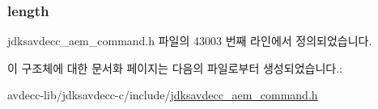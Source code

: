 \subsubsection[{\texorpdfstring{length}{length}}]{ length}\hypertarget{structjdksavdecc__aem__command__set__memory__object__length_a190b76b1f3d5bd26920300e5f073739b}{}\label{structjdksavdecc__aem__command__set__memory__object__length_a190b76b1f3d5bd26920300e5f073739b}


jdksavdecc\+\_\+aem\+\_\+command.\+h 파일의 43003 번째 라인에서 정의되었습니다.



이 구조체에 대한 문서화 페이지는 다음의 파일로부터 생성되었습니다.\+:\begin{DoxyCompactItemize}
\item 
avdecc-\/lib/jdksavdecc-\/c/include/\hyperlink{jdksavdecc__aem__command_8h}{jdksavdecc\+\_\+aem\+\_\+command.\+h}\end{DoxyCompactItemize}

